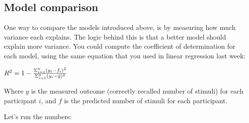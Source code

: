\documentclass[11pt]{article}
\begin{document}
    \subsection{Model comparison}\label{model-comparison}

One way to compare the models introduced above, is by measuring how much
variance each explains. The logic behind this is that a better model
should explain more variance. You could compute the coefficient of
determination for each model, using the same equation that you used in
linear regression last week:

\(R^{2} = 1 - { { \Sigma^{n}_{i=1} (y_{i} - f_{i})^{2} } \over { \Sigma^{n}_{i=1}(y_{i} - \bar{y})^{2} }}\)

Where \(y\) is the measured outcome (correctly recalled number of
stimuli) for each participant \(i\), and \(f\) is the predicted number
of stimuli for each participant.

Let's run the numbers:
\end{document}
